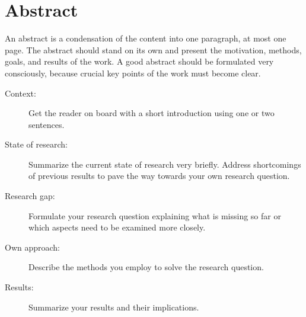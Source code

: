\chapter{Abstract}

{
    \color{orange}
    An abstract is a condensation of the content into one paragraph, at most one page.
    The abstract should stand on its own and present the motivation, methods, goals, and results of the work.
    A good abstract should be formulated very consciously, because crucial key points of the work must become clear.

    \begin{description}
        \item[Context:]{Get the reader on board with a short introduction using one or two sentences.}
        \item[State of research:]{Summarize the current state of research very briefly. Address shortcomings of previous results to pave the way towards your own research question.}
        \item[Research gap:]{Formulate your research question explaining what is missing so far or which aspects need to be examined more closely.}
        \item[Own approach:]{Describe the methods you employ to solve the research question.}
        \item[Results:]{Summarize your results and their implications.}
    \end{description}
}